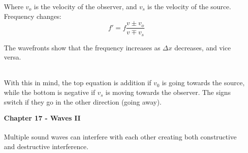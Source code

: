 \documentclass[11pt]{article}
\begin{document}
     \hfill
    \begin{minipage}[b]{0.25\textwidth}
    \end{minipage}
    \hfill
    \begin{minipage}[b] {0.7\textwidth}
        Where $v_o$ is the velocity of the observer, and $v_s$ is the velocity of the source.
        Frequency changes:
        \begin{equation}
            f' = f \frac{v \pm v_o}{v \mp v_s }  \tag{Doppler Effect}\label{doppler}
        \end{equation}

        The wavefronts show that the frequency increases as $\Delta x$ decreases, and vice versa.
    \end{minipage}

    \noindent \\
    With this in mind, the top equation is addition if $v_0$ is going towards the source,
    while the bottom is negative if $v_s$ is moving towards the observer.
    The signs switch if they go in the other direction (going away).

   \newpage
    \noindent \textbf{Chapter 17 - Waves II}
    \noindent \\ \\Multiple sound waves can interfere with each other creating both constructive
    and destructive interference.
\end{document}
